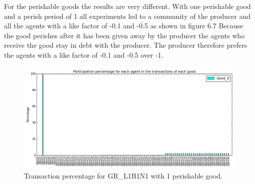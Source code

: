 \documentclass[twoside,openright]{uva-bachelor-thesis}
\begin{document}
For the perishable goods the results are very different. With one perishable good and a perish period of 1 all experiments led to a community of the producer and all the agents with a like factor of -0.1 and -0.5 as shown in figure 6.7 Because the good perishes after it has been given away by the producer the agents who receive the good stay in debt with the producer. The producer therefore prefers the agents with a like factor of -0.1 and -0.5 over -1. \\
\begin{figure}[h!]
  \centering
   \includegraphics[scale=0.4]{Simulation_figures/GR_L1B1N1/1perishable_1-1_15k}
  \caption{Transaction percentage for GR\_L1B1N1 with 1 perishable good.}
\end{figure}
\end{document}
